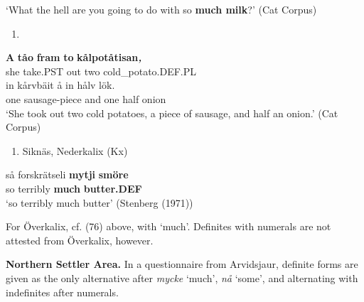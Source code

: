 ‘What the hell are you going to do with so \textbf{much milk}?’ (Cat Corpus)
\z

\begin{enumerate} %
\item 
\end{enumerate} %
\ea\label{}
\gll \textbf{A} \textbf{tåo} \textbf{fram} \textbf{to}\textbf{\textit{  }}\textbf{kålpotåtisan}\textbf{\textit{,}}\\


she  take.PST  out  two  cold\_potato.DEF.PL\\ %


\ea\label{}
\gll in  kårvbäit  å  in  hålv  lök.\\


one  sausage-piece  and  one  half  onion\\ %


‘She took out two cold potatoes, a piece of sausage, and half an onion.’ (Cat Corpus)
\z


\begin{enumerate} %
\item 
Siknäs, Nederkalix (Kx)

\end{enumerate} %
\ea\label{}
\gll så  forskrätseli  \textbf{mytji} \textbf{smöre}\\


so  terribly  \textbf{much} \textbf{butter.DEF}\\ %


‘so terribly much butter’ (Stenberg (1971))
\z

For Överkalix, cf. (76) above, with ‘much’. Definites with numerals are not attested from Överkalix, however.

\textbf{Northern Settler Area. }In a questionnaire from Arvidsjaur, definite forms are given as the only alternative after \textit{mycke} ‘much’, \textit{nå} ‘some’, and alternating with indefinites after numerals.

